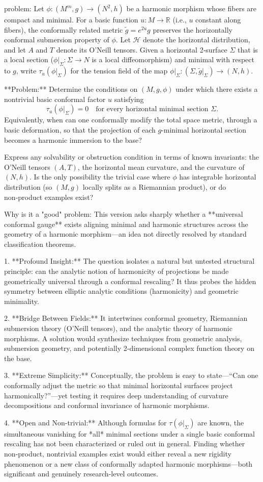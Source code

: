 problem:  
Let $\phi:(M^{m},g)\to (N^{2},h)$ be a harmonic morphism whose fibers are compact and minimal.  
For a basic function $u:M\to\mathbb{R}$ (i.e., $u$ constant along fibers), the conformally related metric $\tilde g=e^{2u}g$ preserves the horizontally conformal submersion property of $\phi$.  
Let $\mathcal{H}$ denote the horizontal distribution, and let $A$ and $T$ denote its O’Neill tensors.  
Given a horizontal 2‑surface $\Sigma$ that is a local section ($\phi|_\Sigma:\Sigma\to N$ is a local diffeomorphism) and minimal with respect to $g$, write $\tau_u(\phi|_\Sigma)$ for the tension field of the map $\phi|_\Sigma:(\Sigma,\tilde g|_\Sigma)\to (N,h)$.  

**Problem:**  
Determine the conditions on $(M,g,\phi)$ under which there exists a nontrivial basic conformal factor $u$ satisfying  
\[
\tau_u(\phi|_\Sigma)=0 \quad \text{for every horizontal minimal section } \Sigma.
\]  
Equivalently, when can one conformally modify the total space metric, through a basic deformation, so that the projection of each $g$-minimal horizontal section becomes a harmonic immersion to the base?  

Express any solvability or obstruction condition in terms of known invariants: the O’Neill tensors $(A,T)$, the horizontal mean curvature, and the curvature of $(N,h)$. Is the only possibility the trivial case where $\phi$ has integrable horizontal distribution (so $(M,g)$ locally splits as a Riemannian product), or do non‑product examples exist?  

Why is it a "good" problem:  
This version asks sharply whether a **universal conformal gauge** exists aligning minimal and harmonic structures across the geometry of a harmonic morphism—an idea not directly resolved by standard classification theorems.  

1. **Profound Insight:** The question isolates a natural but untested structural principle: can the analytic notion of harmonicity of projections be made geometrically universal through a conformal rescaling? It thus probes the hidden symmetry between elliptic analytic conditions (harmonicity) and geometric minimality.  

2. **Bridge Between Fields:** It intertwines conformal geometry, Riemannian submersion theory (O’Neill tensors), and the analytic theory of harmonic morphisms. A solution would synthesize techniques from geometric analysis, submersion geometry, and potentially 2‑dimensional complex function theory on the base.  

3. **Extreme Simplicity:** Conceptually, the problem is easy to state—“Can one conformally adjust the metric so that minimal horizontal surfaces project harmonically?”—yet testing it requires deep understanding of curvature decompositions and conformal invariance of harmonic morphisms.  

4. **Open and Non-trivial:** Although formulas for $\tau(\phi|_\Sigma)$ are known, the simultaneous vanishing for *all* minimal sections under a single basic conformal rescaling has not been characterized or ruled out in general. Finding whether non‑product, nontrivial examples exist would either reveal a new rigidity phenomenon or a new class of conformally adapted harmonic morphisms—both significant and genuinely research‑level outcomes.